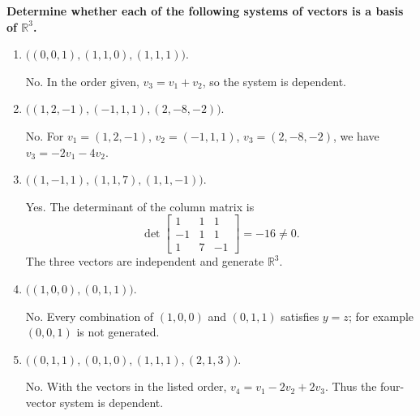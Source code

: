 \providecommand{\rank}{\operatorname{r}}
\providecommand{\RR}{\mathbb R}
\providecommand{\CC}{\mathbb C}
\providecommand{\KK}{\mathbb K}

\setcounter{enumi}{82}
\item {\bfseries\boldmath
Determine whether each of the following systems of vectors is a basis of $\RR^3$.
}

\begin{enumerate}[label=\alph*)]

\item $\bigl((0,0,1),(1,1,0),(1,1,1)\bigr)$.

\begin{answer}
No. In the order given, $v_3=v_1+v_2$, so the system is dependent.
\end{answer}

\item $\bigl((1,2,-1),(-1,1,1),(2,-8,-2)\bigr)$.

\begin{answer}
No. For $v_1=(1,2,-1)$, $v_2=(-1,1,1)$, $v_3=(2,-8,-2)$,
we have $v_3=-2v_1-4v_2$.
\end{answer}

\item $\bigl((1,-1,1),(1,1,7),(1,1,-1)\bigr)$.

\begin{answer}
Yes. The determinant of the column matrix is
\[
 \det\begin{bmatrix}1&1&1\\-1&1&1\\1&7&-1\end{bmatrix}=-16\ne0.
\]
The three vectors are independent and generate $\RR^3$.
\end{answer}

\item $\bigl((1,0,0),(0,1,1)\bigr)$.

\begin{answer}
No. Every combination of $(1,0,0)$ and $(0,1,1)$ satisfies $y=z$;
for example $(0,0,1)$ is not generated.
\end{answer}

\item $\bigl((0,1,1),(0,1,0),(1,1,1),(2,1,3)\bigr)$.

\begin{answer}
No. With the vectors in the listed order,
$v_4=v_1-2v_2+2v_3$. Thus the four-vector system is dependent.
\end{answer}
\end{enumerate}
